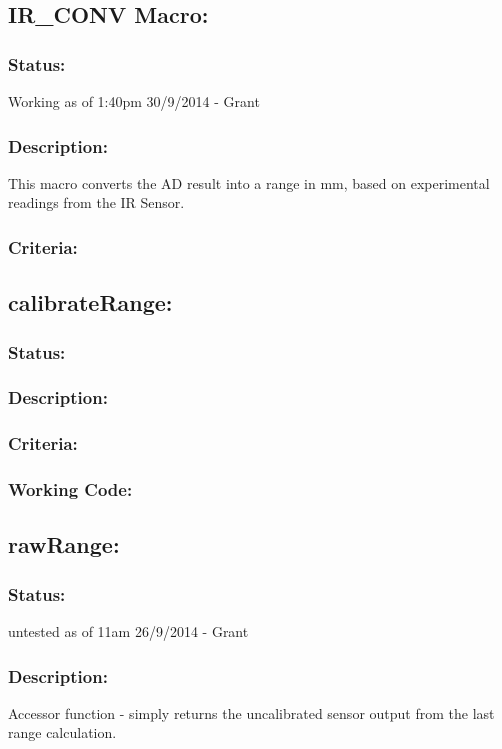 \documentclass[]{article}
\begin{document}
\subsection{IR\_CONV Macro:}
\subsubsection{Status:}
Working as of 1:40pm 30/9/2014 - Grant

\subsubsection{Description:}
This macro converts the AD result into a range in mm, based on experimental readings from the IR Sensor.

\subsubsection{Criteria:}


\subsection{calibrateRange:}
\subsubsection{Status:}

\subsubsection{Description:}

\subsubsection{Criteria:}

\subsubsection{Working Code:}

\subsection{rawRange:}
\subsubsection{Status:}
untested as of 11am 26/9/2014 - Grant

\subsubsection{Description:}
Accessor function - simply returns the uncalibrated sensor output from the last range calculation.
\end{document}
